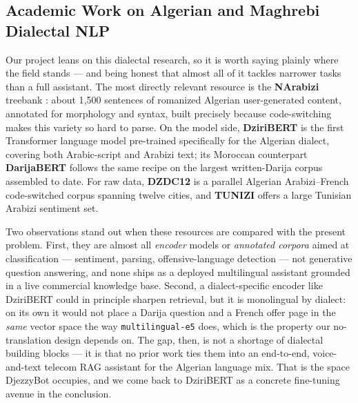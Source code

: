 \documentclass[12pt, a4paper]{report}
\newcommand{\sourced}[1]{#1}        %
\newcommand{\humantext}[1]{#1}      %
\begin{document}
\subsection{Academic Work on Algerian and Maghrebi Dialectal NLP}
\humantext{Our project leans on this dialectal research, so it is worth saying plainly where the field stands --- and being honest that almost all of it tackles narrower tasks than a full assistant.} \sourced{The most directly relevant resource is the \textbf{NArabizi} treebank \cite{seddah2020narabizi}: about 1{,}500 sentences of romanized Algerian user-generated content, annotated for morphology and syntax, built precisely because code-switching makes this variety so hard to parse.} \sourced{On the model side, \textbf{DziriBERT} \cite{abdaoui2021dziribert} is the first Transformer language model pre-trained specifically for the Algerian dialect, covering both Arabic-script and Arabizi text; its Moroccan counterpart \textbf{DarijaBERT} \cite{gaanoun2024darijabert} follows the same recipe on the largest written-Darija corpus assembled to date.} \sourced{For raw data, \textbf{DZDC12} \cite{abainia2019dzdc12} is a parallel Algerian Arabizi--French code-switched corpus spanning twelve cities, and \textbf{TUNIZI} \cite{fourati2020tunizi} offers a large Tunisian Arabizi sentiment set.}

\humantext{Two observations stand out when these resources are compared with the present problem. First, they are almost all \emph{encoder} models or \emph{annotated corpora} aimed at classification --- sentiment, parsing, offensive-language detection --- not generative question answering, and none ships as a deployed multilingual assistant grounded in a live commercial knowledge base. Second, a dialect-specific encoder like DziriBERT could in principle sharpen retrieval, but it is monolingual by dialect: on its own it would not place a Darija question and a French offer page in the \emph{same} vector space the way \texttt{multilingual-e5} does, which is the property our no-translation design depends on. The gap, then, is not a shortage of dialectal building blocks --- it is that no prior work ties them into an end-to-end, voice-and-text telecom RAG assistant for the Algerian language mix. That is the space DjezzyBot occupies, and we come back to DziriBERT as a concrete fine-tuning avenue in the conclusion.}
\end{document}
